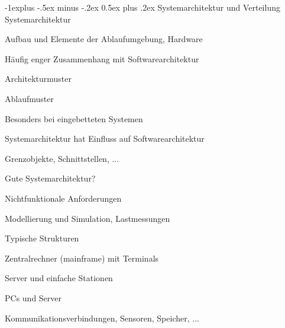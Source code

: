 \documentclass[a4paper]{article}
\makeatletter
\renewcommand{\subsection}{\@startsection{subsection}{2}{0mm}%
                                {-1explus -.5ex minus -.2ex}%
                                {0.5ex plus .2ex}%
                                {\normalfont\normalsize\bfseries}}
\makeatother
\begin{document}
\begin{multicols}{3}
  \subsection{Systemarchitektur und Verteilung}
  Systemarchitektur
  \begin{itemize*}
    \item Aufbau und Elemente der Ablaufumgebung, Hardware
    \item Häufig enger Zusammenhang mit Softwarearchitektur
    \begin{itemize*}
      \item Architekturmuster
      \item Ablaufmuster
    \end{itemize*}
    \item Besonders bei eingebetteten Systemen
    \item Systemarchitektur hat Einfluss auf Softwarearchitektur
    \begin{itemize*}
      \item Grenzobjekte, Schnittstellen, ...
    \end{itemize*}
    \item Gute Systemarchitektur?
    \begin{itemize*}
      \item Nichtfunktionale Anforderungen
      \item Modellierung und Simulation, Lastmessungen
    \end{itemize*}
  \end{itemize*}

  Typische Strukturen
  \begin{itemize*}
    \item Zentralrechner (mainframe) mit Terminals
    \item Server und einfache Stationen
    \item PCs und Server
    \item Kommunikationsverbindungen, Sensoren, Speicher, ...
  \end{itemize*}



\end{multicols}
\end{document}
